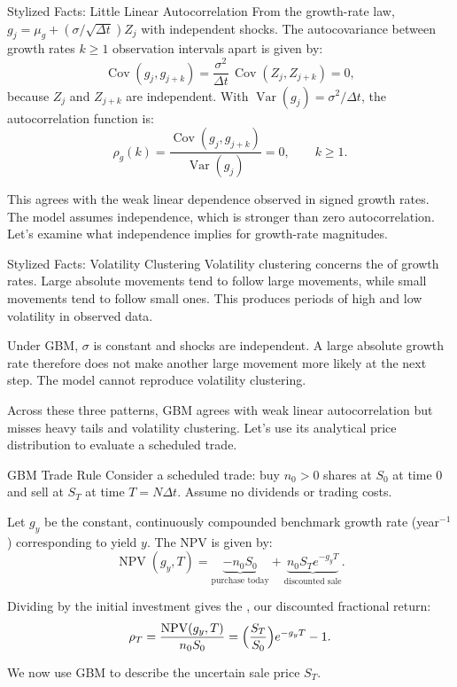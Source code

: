 \documentclass[aspectratio=169,11pt]{beamer}
\newcommand{\Var}{\operatorname{Var}}
\newcommand{\Cov}{\operatorname{Cov}}
\newcommand{\mug}{\mu_g}
\begin{document}
\begin{frame}{Stylized Facts: Little Linear Autocorrelation}
  From the growth-rate law, $g_j=\mug+(\sigma/\sqrt{\Delta t})Z_j$ with
  independent shocks. The autocovariance between growth rates $k\ge1$
  observation intervals apart is given by:
  \[
    \Cov(g_j,g_{j+k})
    =\frac{\sigma^2}{\Delta t}\,\Cov(Z_j,Z_{j+k})=0,
  \]
  because $Z_j$ and $Z_{j+k}$ are independent. With
  $\Var(g_j)=\sigma^2/\Delta t$, the autocorrelation function is:
  \[
    \boxed{\rho_g(k)=\frac{\Cov(g_j,g_{j+k})}{\Var(g_j)}=0,\qquad k\ge1.}
  \]

  This agrees with the weak linear dependence observed in signed growth
  rates. The model assumes independence, which is stronger than zero
  autocorrelation. Let's examine what independence implies for growth-rate magnitudes.
\end{frame}

\begin{frame}{Stylized Facts: Volatility Clustering}
  Volatility clustering concerns the  of growth rates.
  Large absolute movements tend to follow large movements, while small
  movements tend to follow small ones. This produces periods of high and
  low volatility in observed data.

  \vspace{0.7em}
  Under GBM, $\sigma$ is constant and shocks are independent. A large absolute
  growth rate therefore does not make another large movement more likely at
  the next step. The model cannot reproduce volatility clustering.

  \vspace{0.7em}
  Across these three patterns, GBM agrees with weak linear autocorrelation
  but misses heavy tails and volatility clustering. Let's
  use its analytical price distribution to evaluate a scheduled trade.
\end{frame}

\begin{frame}{GBM Trade Rule}
  Consider a scheduled trade: buy $n_0>0$ shares at $S_0$
  at time $0$ and sell at $S_T$ at time $T=N\Delta t$. Assume no dividends
  or trading costs.

  \vspace{0.4em}
  Let $g_y$ be the constant, continuously compounded benchmark growth rate
  (year$^{-1}$) corresponding to yield $y$. The NPV is given by:
  \[
    \operatorname{NPV}(g_y,T)
    =\underbrace{-n_0S_0}_{\text{purchase today}}
    +\underbrace{n_0S_Te^{-g_yT}}_{\text{discounted sale}}.
  \]

  Dividing by the initial investment gives the , our
  discounted fractional return:
  \[
    \rho_T=\frac{\operatorname{NPV}(g_y,T)}{n_0S_0}
    =\Bigl(\frac{S_T}{S_0}\Bigr)e^{-g_yT}-1.
  \]

  We now use GBM to describe the uncertain sale price $S_T$.
\end{frame}
\end{document}
